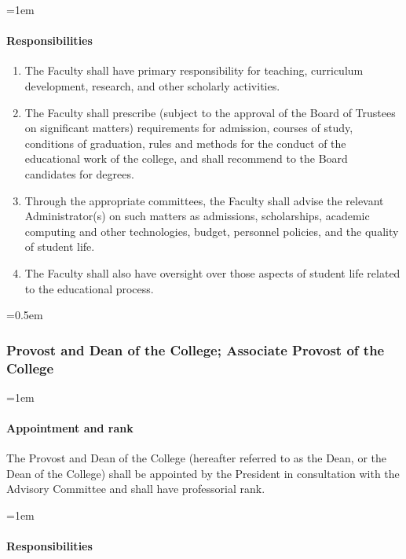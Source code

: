 \documentclass{manual}
\let\oldsubsubsection\subsubsection
\renewcommand\subsubsection{\leftskip=0.5em\oldsubsubsection}
\let\oldparagraph\paragraph
\renewcommand\paragraph{\leftskip=1em\oldparagraph}
\newcommand{\itemLevelA}{\alph*.}
\newcommand{\itemRefA}{\alph*}
\begin{document}
\paragraph{Responsibilities}\label{sub:Responsibilities}
\begin{enumerate}[label=\itemLevelA,ref=\itemRefA]
\item The Faculty shall have primary responsibility for teaching, curriculum development, research, and other scholarly activities.
\item The Faculty shall prescribe (subject to the approval of the Board of Trustees on significant matters) requirements for admission, courses of study, conditions of graduation, rules and methods for the conduct of the educational work of the college, and shall recommend to the Board candidates for degrees.
\item Through the appropriate committees, the Faculty shall advise the relevant Administrator(s) on such matters as admissions, scholarships, academic computing and other technologies, budget, personnel policies, and the quality of student life.
\item The Faculty shall also have oversight over those aspects of student life related to the educational process. 
\end{enumerate}

\subsubsection{Provost and Dean of the College; Associate Provost of the College}

\paragraph{Appointment and rank}
The Provost and Dean of the College (hereafter referred to as the Dean, or the Dean of the College) shall be appointed by the President in consultation with the Advisory Committee and shall have professorial rank.

\paragraph{Responsibilities}
\end{document}
